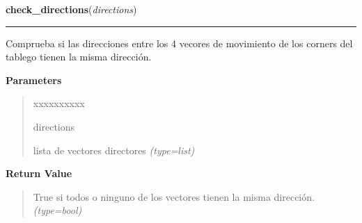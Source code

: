 \hspace{.8\funcindent}\begin{boxedminipage}{\funcwidth}

    \raggedright \textbf{check\_directions}(\textit{directions})

    \vspace{-1.5ex}

    \rule{\textwidth}{0.5\fboxrule}
\setlength{\parskip}{2ex}
Comprueba si las direcciones entre los 4 vecores de movimiento de los corners del tablego tienen la misma dirección.

\setlength{\parskip}{1ex}
      \textbf{Parameters}
      \vspace{-1ex}

      \begin{quote}
        \begin{Ventry}{xxxxxxxxxx}

          \item[directions]


lista de vectores directores
            {\it (type=list)}

        \end{Ventry}

      \end{quote}

      \textbf{Return Value}
    \vspace{-1ex}

      \begin{quote}

True si todos o ninguno de los vectores tienen la misma dirección.
      {\it (type=bool)}

      \end{quote}

    \end{boxedminipage}

    \label{src:check_goban_moved:check_goban_moved}

    \vspace{0.5ex}

